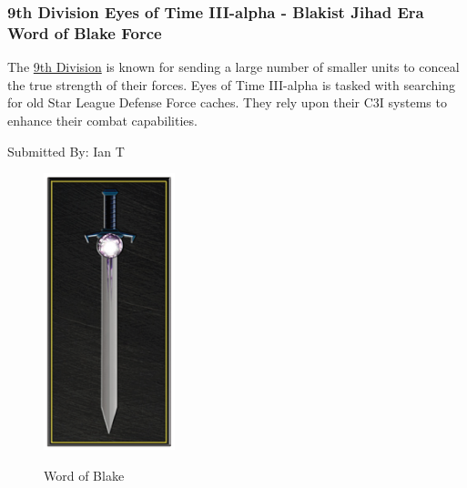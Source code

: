 \subsubsection{9th Division Eyes of Time III-alpha - Blakist Jihad Era Word of Blake Force}

The \href{https://www.sarna.net/wiki/9th_Division_(Word_of_Blake)}{9th Division} is known for sending a large number of smaller units to conceal the true strength of their forces.
Eyes of Time III-alpha is tasked with searching for old Star League Defense Force caches.
They rely upon their C3I systems to enhance their combat capabilities.

Submitted By: Ian T

\begin{figure}[!h]
  \centering
  \includegraphics[alt='Word of Blake Logo', width=1.5in, height=3.167in]{img/Word-of-Blake.png}
  \caption*{Word of Blake}
\end{figure}

